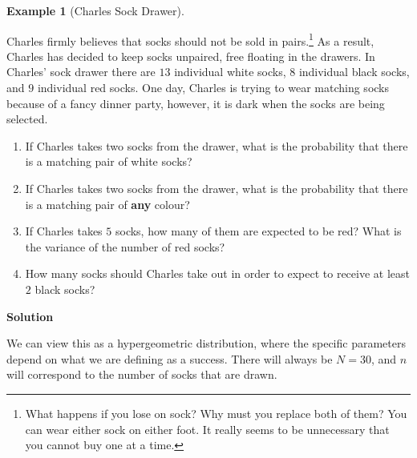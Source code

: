 \documentclass[
  letterpaper,
  DIV=11,
  numbers=noendperiod]{scrreprt}
\providecommand{\tightlist}{%
  \setlength{\itemsep}{0pt}\setlength{\parskip}{0pt}}\usepackage{longtable,booktabs,array}
\theoremstyle{definition}
\theoremstyle{definition}
\newtheorem{example}{Example}[chapter]
\theoremstyle{definition}
\theoremstyle{remark}
\begin{document}
\begin{example}[Charles Sock
Drawer]\protect\hypertarget{exm-hyper-geometric}{}\label{exm-hyper-geometric}

Charles firmly believes that socks should not be sold in
pairs.\footnote{What happens if you lose on sock? Why must you replace
  both of them? You can wear either sock on either foot. It really seems
  to be unnecessary that you cannot buy one at a time.} As a result,
Charles has decided to keep socks unpaired, free floating in the
drawers. In Charles' sock drawer there are \(13\) individual white
socks, \(8\) individual black socks, and \(9\) individual red socks. One
day, Charles is trying to wear matching socks because of a fancy dinner
party, however, it is dark when the socks are being selected.

\begin{enumerate}
\def\labelenumi{\alph{enumi}.}
\tightlist
\item
  If Charles takes two socks from the drawer, what is the probability
  that there is a matching pair of white socks?
\item
  If Charles takes two socks from the drawer, what is the probability
  that there is a matching pair of \textbf{any} colour?
\item
  If Charles takes \(5\) socks, how many of them are expected to be red?
  What is the variance of the number of red socks?
\item
  How many socks should Charles take out in order to expect to receive
  at least \(2\) black socks?
\end{enumerate}

\begin{tcolorbox}[enhanced jigsaw, colback=white, colframe=quarto-callout-color-frame, arc=.35mm, leftrule=.75mm, rightrule=.15mm, opacityback=0, breakable, bottomrule=.15mm, left=2mm, toprule=.15mm]

\vspace{-3mm}\textbf{Solution}\vspace{3mm}

We can view this as a hypergeometric distribution, where the specific
parameters depend on what we are defining as a success. There will
always be \(N=30\), and \(n\) will correspond to the number of socks
that are drawn.


\end{tcolorbox}
\end{example}
\end{document}
